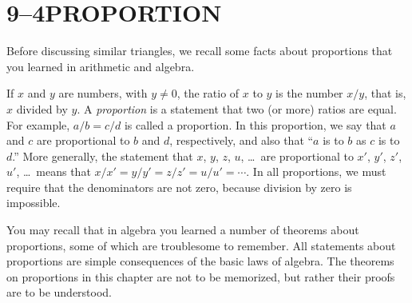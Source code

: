 \documentclass[11pt]{book}
\theoremstyle{bkplain}
\theoremstyle{XIplainnote}
\theoremstyle{bkplain}
\theoremstyle{bkplain}
\begin{document}
\section*{9--4\quad PROPORTION}

Before discussing similar triangles, we recall some facts about proportions that
you learned in arithmetic and algebra.

\begin{definition}
If $x$ and $y$ are numbers, with $y \neq 0$, the ratio of $x$ to $y$ is the
number $x/y$, that is, $x$ divided by $y$. A \emph{proportion} is a statement
that two (or more) ratios are equal. For example, $a/b = c/d$ is called a
proportion. In this proportion, we say that $a$ and $c$ are proportional to $b$
and $d$, respectively, and also that ``$a$ is to $b$ as $c$ is to $d$.'' More
generally, the statement that $x$, $y$, $z$, $u$, \dots\ are proportional to
$x'$, $y'$, $z'$, $u'$, \dots\ means that $x/x' = y/y' = z/z' = u/u' = \cdots$.
In all proportions, we must require that the denominators are not zero, because
division by zero is impossible.
\end{definition}

You may recall that in algebra you learned a number of theorems about
proportions, some of which are troublesome to remember. All statements about
proportions are simple consequences of the basic laws of algebra. The theorems on
proportions in this chapter are not to be memorized, but rather their proofs are
to be understood.
\end{document}
